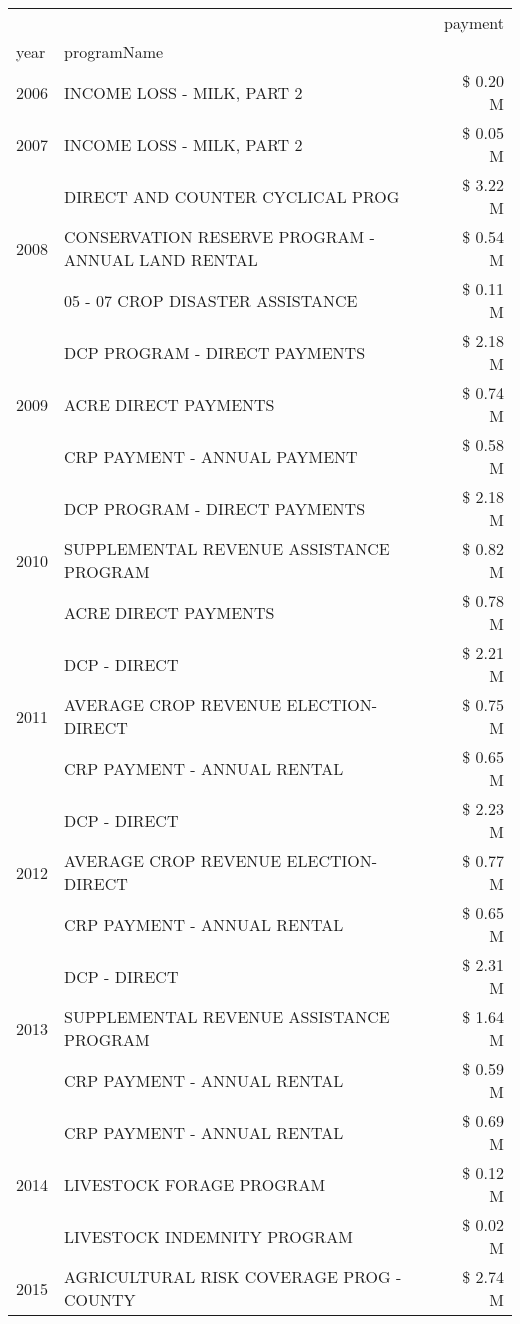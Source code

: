 \begin{tabular}{llr}
\toprule
 &  & payment \\
year & programName &  \\
\midrule
2006 & INCOME LOSS - MILK, PART 2 & \$ 0.20 M \\
\cline{1-3}
2007 & INCOME LOSS - MILK, PART 2 & \$ 0.05 M \\
\cline{1-3}
\multirow[t]{3}{*}{2008} & DIRECT AND COUNTER CYCLICAL PROG & \$ 3.22 M \\
 & CONSERVATION RESERVE PROGRAM - ANNUAL LAND RENTAL & \$ 0.54 M \\
 & 05 - 07 CROP DISASTER ASSISTANCE & \$ 0.11 M \\
\cline{1-3}
\multirow[t]{3}{*}{2009} & DCP PROGRAM - DIRECT PAYMENTS & \$ 2.18 M \\
 & ACRE DIRECT PAYMENTS & \$ 0.74 M \\
 & CRP PAYMENT - ANNUAL PAYMENT & \$ 0.58 M \\
\cline{1-3}
\multirow[t]{3}{*}{2010} & DCP PROGRAM - DIRECT PAYMENTS & \$ 2.18 M \\
 & SUPPLEMENTAL REVENUE ASSISTANCE PROGRAM & \$ 0.82 M \\
 & ACRE DIRECT PAYMENTS & \$ 0.78 M \\
\cline{1-3}
\multirow[t]{3}{*}{2011} & DCP - DIRECT & \$ 2.21 M \\
 & AVERAGE CROP REVENUE ELECTION-DIRECT & \$ 0.75 M \\
 & CRP PAYMENT - ANNUAL RENTAL & \$ 0.65 M \\
\cline{1-3}
\multirow[t]{3}{*}{2012} & DCP - DIRECT & \$ 2.23 M \\
 & AVERAGE CROP REVENUE ELECTION-DIRECT & \$ 0.77 M \\
 & CRP PAYMENT - ANNUAL RENTAL & \$ 0.65 M \\
\cline{1-3}
\multirow[t]{3}{*}{2013} & DCP - DIRECT & \$ 2.31 M \\
 & SUPPLEMENTAL REVENUE ASSISTANCE PROGRAM & \$ 1.64 M \\
 & CRP PAYMENT - ANNUAL RENTAL & \$ 0.59 M \\
\cline{1-3}
\multirow[t]{3}{*}{2014} & CRP PAYMENT - ANNUAL RENTAL & \$ 0.69 M \\
 & LIVESTOCK FORAGE PROGRAM & \$ 0.12 M \\
 & LIVESTOCK INDEMNITY PROGRAM & \$ 0.02 M \\
\cline{1-3}
\multirow[t]{3}{*}{2015} & AGRICULTURAL RISK COVERAGE PROG - COUNTY & \$ 2.74 M \\

\end{tabular}
